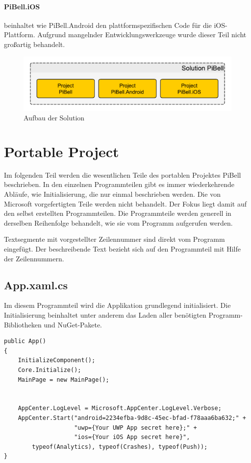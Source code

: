 \paragraph{PiBell.iOS} beinhaltet wie PiBell.Android den plattformspezifischen Code für die iOS-Platt\-form. Aufgrund mangelnder Entwicklungswerkzeuge wurde dieser Teil nicht großartig behandelt.\par

\begin{figure}[H]
\centering\includegraphics[width=0.9\linewidth]{images/xamarin/struktur.pdf}
\caption{Aufbau der Solution}
\end{figure}

%
\section{Portable Project}
Im folgenden Teil werden die wesentlichen Teile des portablen Projektes PiBell beschrieben.
In den einzelnen Programmteilen gibt es immer wiederkehrende Abläufe, wie Initialisierung, die nur einmal beschrieben werden.
Die von Microsoft vorgefertigten Teile werden nicht behandelt.
Der Fokus liegt damit auf den selbst erstellten Programmteilen.
Die Programmteile werden generell in derselben Reihenfolge behandelt, wie sie vom Programm aufgerufen werden.\par

Textsegmente mit vorgestellter Zeilennummer sind direkt vom Programm eingefügt.
Der beschreibende Text bezieht sich auf den Programmteil mit Hilfe der Zeilennummern.

\subsection{App.xaml.cs}
Im diesem Programmteil wird die Applikation grundlegend initialisiert.
Die Initialisierung beinhaltet unter anderem das Laden aller benötigten Programm-Bibliotheken und NuGet-Pakete.
\begin{lstlisting}[firstnumber=17]
public App()
{
    InitializeComponent();
    Core.Initialize();
    MainPage = new MainPage();


    AppCenter.LogLevel = Microsoft.AppCenter.LogLevel.Verbose;
    AppCenter.Start("android=2234efba-9d8c-45ec-bfad-f78aaa6ba632;" +
                    "uwp={Your UWP App secret here};" +
                    "ios={Your iOS App secret here}",
        typeof(Analytics), typeof(Crashes), typeof(Push));
}
\end{lstlisting}
